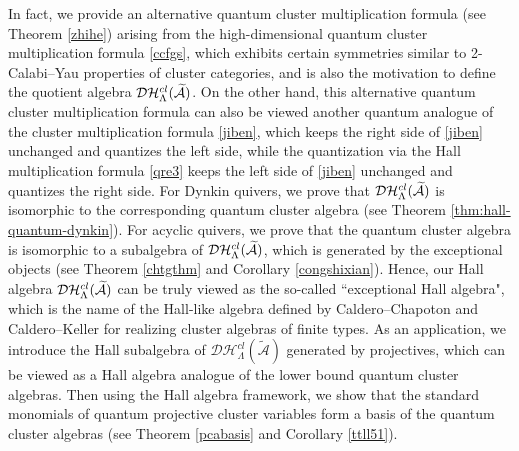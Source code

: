 \documentclass[reqno,12pt]{amsart}
\numberwithin{equation}{section}
\theoremstyle{plain} %
\theoremstyle{definition} %
\begin{document}
In fact, we provide an alternative quantum cluster multiplication formula (see Theorem \ref{zhihe}) arising from the high-dimensional quantum cluster multiplication formula \eqref{ccfgs}, which exhibits certain symmetries similar to 2-Calabi--Yau properties of cluster categories, and is also
the motivation to define the quotient algebra $\mathcal {D}\mathcal {H}_\Lambda^{{cl}}(\widetilde{\mathcal{A}})$.
On the other hand, this alternative quantum cluster multiplication formula can also be viewed another quantum analogue of the cluster multiplication formula \eqref{jiben}, which keeps the right side of \eqref{jiben} unchanged and quantizes the left side, while the quantization via the Hall multiplication formula \eqref{qre3} keeps the left side of \eqref{jiben} unchanged and quantizes the right side.
For Dynkin quivers, we prove that $\mathcal {D}\mathcal {H}_\Lambda^{{cl}}(\widetilde{\mathcal{A}})$ is isomorphic to the corresponding quantum cluster algebra (see Theorem \ref{thm:hall-quantum-dynkin}). For acyclic quivers, we prove that the quantum cluster algebra is isomorphic to a subalgebra of $\mathcal {D}\mathcal {H}_\Lambda^{{cl}}(\widetilde{\mathcal{A}})$, which is generated by the exceptional objects (see Theorem \ref{chtgthm} and Corollary \ref{congshixian}). Hence, our Hall algebra $\mathcal {D}\mathcal {H}_\Lambda^{{cl}}(\widetilde{\mathcal{A}})$ can be truly viewed as the so-called ``exceptional Hall algebra", which is the name of the Hall-like algebra defined by Caldero--Chapoton \cite{CC} and Caldero--Keller \cite{CK2005} for realizing cluster algebras of finite types.
As an application, we introduce the Hall subalgebra of $\mathcal{D}\mathcal{H}_\Lambda^{cl}(\widetilde{\mathcal{A}})$ generated by projectives, which can be viewed as a Hall algebra analogue of the lower bound quantum cluster algebras. Then using the Hall algebra framework, we show that the standard monomials of quantum projective cluster variables form a basis of the quantum cluster algebras (see Theorem \ref{pcabasis} and Corollary \ref{ttll51}).
\end{document}
